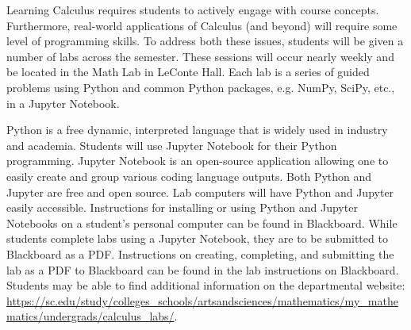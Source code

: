 \documentclass[11pt,letterpaper]{article}
\begin{document}
Learning Calculus requires students to actively engage with course concepts. Furthermore, real-world applications of Calculus (and beyond) will require some level of programming skills. To address both these issues, students will be given a number of labs across the semester. These sessions will occur nearly weekly and be located in the Math Lab in LeConte Hall. Each lab is a series of guided problems using Python and common Python packages, e.g. NumPy, SciPy, etc., in a Jupyter Notebook. \pspace

Python is a free dynamic, interpreted language that is widely used in industry and academia. Students will use Jupyter Notebook for their Python programming. Jupyter Notebook is an open-source application allowing one to easily create and group various coding language outputs. Both Python and Jupyter are free and open source. Lab computers will have Python and Jupyter easily accessible. Instructions for installing or using Python and Jupyter Notebooks on a student's personal computer can be found in Blackboard. While students complete labs using a Jupyter Notebook, they are to be submitted to Blackboard as a PDF. Instructions on creating, completing, and submitting the lab as a PDF to Blackboard can be found in the lab instructions on Blackboard. Students may be able to find additional information on the departmental website: \url{https://sc.edu/study/colleges\_schools/artsandsciences/mathematics/my\_mathematics/undergrads/calculus\_labs/}. \pspace
\end{document}
